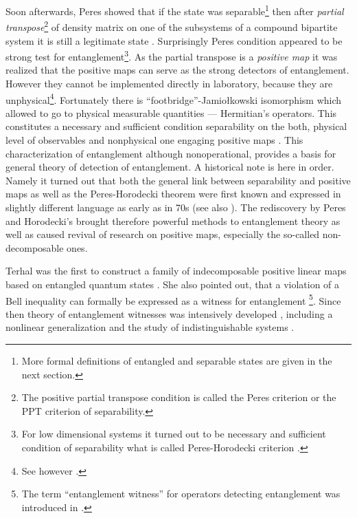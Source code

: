 \documentclass[rmp,12pt,preprint]{revtex4-2}
\begin{document}
Soon afterwards, Peres showed that if the state was
separable\footnote{More formal definitions of entangled and separable
  states are given in the next section.} then after {\it partial
  transpose}\footnote{The positive partial transpose condition is
  called the Peres criterion or the PPT criterion of separability.} of
density matrix on one of the subsystems of a compound bipartite system
it is still a legitimate state \cite {Peres}. Surprisingly Peres
condition appeared to be strong test for entanglement\footnote{For low
  dimensional systems it turned out to be necessary and sufficient
  condition of separability what is called Peres-Horodecki criterion
  \cite{sep1996}.}. As the partial transpose is a {\it positive map}
it was realized that the positive maps can serve as the strong
detectors of entanglement. However they cannot be implemented directly
in laboratory, because they are unphysical\footnote {See however \cite
  {PHAE}.}. Fortunately there is ``footbridge''-Jamio\l{}kowski
isomorphism \cite {Jamiolkowski} which allowed to go to physical
measurable quantities --- Hermitian's operators. This constitutes a
necessary and sufficient condition separability on the both, physical
level of observables and nonphysical one engaging positive maps \cite
{sep1996}. This characterization of entanglement although
nonoperational, provides a basis for general theory of detection of
entanglement.  A historical note is here in order.  Namely it turned
out that both the general link between separability and positive maps
as well as the Peres-Horodecki theorem were first known and expressed
in slightly different language as early as in 70s \cite{Choi1972}
(see also \cite{Osaka,Woronowicz,Stoermer}).  The rediscovery by Peres
and Horodecki's brought therefore powerful methods to entanglement
theory as well as caused revival of research on positive maps,
especially the so-called non-decomposable ones.

Terhal was the first
to construct a family of indecomposable positive linear maps based on
entangled quantum states \cite {Terhal2000-laa}. She also pointed out,
that a violation of a Bell inequality can formally be expressed as a
witness for entanglement \cite {TerhalB}\footnote {The term
  ``entanglement witness'' for operators detecting entanglement was
  introduced in \cite {TerhalB}.}.  Since then theory of entanglement
witnesses was intensively developed \cite {Lewenstein00a,TothG_s,
  GuehneHBE_s,Kiesel_s,BrussReflections,BrandaoV,Brandao2005-witent},
including a nonlinear generalization \cite {GuehneL1,GuehneLutkenhaus}
and the study of indistinguishable systems \cite
{SchliemannCKML-fermion,EckertSBL-fermion}.
\end{document}
